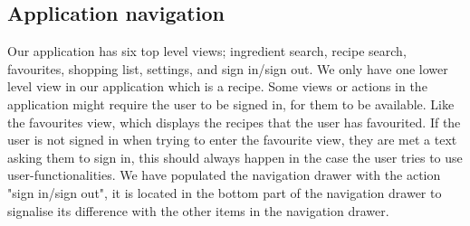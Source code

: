 \subsection{Application navigation}
Our application has six top level views; ingredient search, recipe search, favourites, shopping list, settings, and sign in/sign out. 
We only have one lower level view in our application which is a recipe. 
Some views or actions in the application might require the user to be signed in, for them to be available. 
Like the favourites view, which displays the recipes that the user has favourited. 
If the user is not signed in when trying to enter the favourite view, they are met a text asking them to sign in, this should always happen in the case the user tries to use user-functionalities. 
We have populated the navigation drawer with the action "sign in/sign out", it is located in the bottom part of the navigation drawer to signalise its difference with the other items in the navigation drawer. 